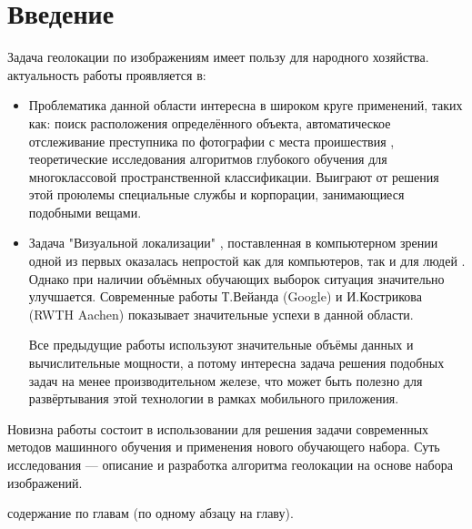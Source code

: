\chapter*{Введение}
\label{sec:afterwords}

Задача геолокации по изображениям имеет пользу для народного хозяйства.
актуальность работы проявляется в:
	\begin{itemize}
		\item Проблематика данной области интересна в широком круге применений, таких как: 
		поиск расположения определённого объекта, автоматическое отслеживание преступника по фотографии с места проишествия , теоретические исследования алгоритмов глубокого обучения для многоклассовой пространственной классификации. Выиграют от решения этой проюлемы специальные службы и корпорации, занимающиеся подобными вещами.
		\item Задача "Визуальной локализации" \cite{im2gps}, поставленная в компьютерном зрении одной из первых оказалась непростой как для компьютеров, так и для людей \cite{Thompson1999geomReas}. Однако при наличии объёмных обучающих выборок ситуация значительно улучшается. Современные работы Т.Вейанда (Google) и И.Кострикова (RWTH Aachen) \cite{weyand2016planet} показывает значительные успехи в данной области.
		
		Все предыдущие работы используют значительные объёмы данных и вычислительные мощности, а потому интересна задача решения подобных задач на менее производительном железе, что может быть полезно для развёртывания этой  технологии в рамках мобильного приложения.
	\end{itemize}
	Новизна работы состоит в использовании для решения задачи современных методов машинного обучения и применения нового обучающего набора.
	Суть исследования --- описание и разработка алгоритма геолокации на основе набора изображений.
	\item содержание по главам (по одному абзацу на главу).

